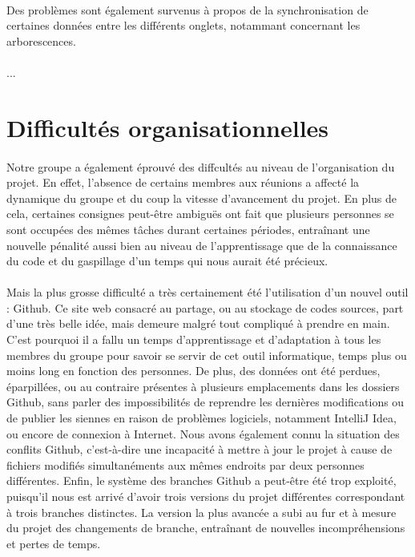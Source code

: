 \documentclass[a4paper,10pt]{report}
\begin{document}
      \paragraph{}
	Des problèmes sont également survenus à propos de la synchronisation de certaines données entre les différents onglets, notammant concernant les arborescences.

      \paragraph{}
	...
      
      
      
    \section{Difficultés organisationnelles}
      \paragraph{}
	Notre groupe a également éprouvé des diffcultés au niveau de l'organisation du projet. 
	En effet, l'absence de certains membres aux réunions a affecté la dynamique du groupe et du coup la vitesse d'avancement du projet.
	En plus de cela, certaines consignes peut-être ambiguës ont fait que plusieurs personnes se sont occupées des mêmes tâches durant certaines périodes, entraînant une nouvelle pénalité aussi bien au niveau de l'apprentissage que de la connaissance du code et du gaspillage d'un temps qui nous aurait été précieux.
	
      \paragraph{}
	Mais la plus grosse difficulté a très certainement été l'utilisation d'un nouvel outil : Github.
	Ce site web consacré au partage, ou au stockage de codes sources, part d'une très belle idée, mais demeure malgré tout compliqué à prendre en main.
	C'est pourquoi il a fallu un temps d'apprentissage et d'adaptation à tous les membres du groupe pour savoir se servir de cet outil informatique, temps plus ou moins long en fonction des personnes.
	De plus, des données ont été perdues, éparpillées, ou au contraire présentes à plusieurs emplacements dans les dossiers Github, sans parler des impossibilités de reprendre les dernières modifications ou de publier les siennes en raison de problèmes logiciels, notamment IntelliJ Idea, ou encore de connexion à Internet.
	Nous avons également connu la situation des conflits Github, c'est-à-dire une incapacité à mettre à jour le projet à cause de fichiers modifiés simultanéments aux mêmes endroits par deux personnes différentes.
	Enfin, le système des branches Github a peut-être été trop exploité, puisqu'il nous est arrivé d'avoir trois versions du projet différentes correspondant à trois branches distinctes. La version la plus avancée a subi au fur et à mesure du projet des changements de branche, entraînant de nouvelles incompréhensions et pertes de temps.
    
\end{document}
